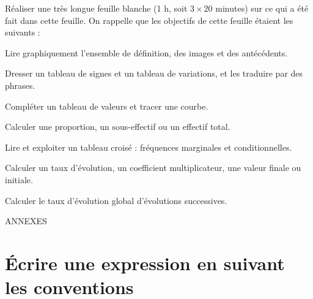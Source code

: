 \documentclass[10pt,a4paper]{article}
\begin{document}
Réaliser une très longue feuille blanche (1 h, soit \(3\times 20\) minutes) sur ce qui a été fait dans cette feuille. On rappelle que les objectifs de cette feuille étaient les suivants :

\medskip

Lire graphiquement l'ensemble de définition, des images et des antécédents.\par\smallskip
Dresser un tableau de signes et un tableau de variations, et les traduire par des phrases.\par\smallskip
Compléter un tableau de valeurs et tracer une courbe.\par\smallskip
Calculer une proportion, un sous-effectif ou un effectif total.\par\smallskip
Lire et exploiter un tableau croisé : fréquences marginales et conditionnelles.\par\smallskip
Calculer un taux d'évolution, un coefficient multiplicateur, une valeur finale ou initiale.\par\smallskip
Calculer le taux d'évolution global d'évolutions successives.


\newpage

\begin{center}
    \Huge ANNEXES
\end{center}

\appendix

\section{Écrire une expression en suivant les conventions} \label{annexe-expr-mult}
\end{document}
